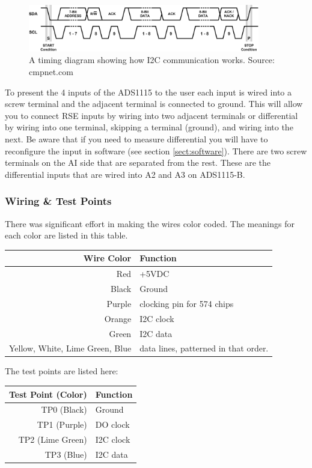 \documentclass{article}
\begin{document}
\begin{figure}
\centering
\includegraphics[width=0.9\textwidth]{i2cTiming.png}
\caption{A timing diagram showing how I2C communication works. Source: cmpnet.com}
\label{fig:i2cTiming}
\end{figure}

To present the 4 inputs of the ADS1115 to the user each input is wired into a screw terminal and the adjacent terminal is connected to ground. This will allow you to connect RSE inputs by wiring into two adjacent terminals or differential by wiring into one terminal, skipping a terminal (ground), and wiring into the next. Be aware that if you need to measure differential you will have to reconfigure the input in software (see section \ref{sect:software}). There are two screw terminals on the AI side that are separated from the rest. These are the differential inputs that are wired into A2 and A3 on ADS1115-B.


\subsubsection{Wiring \& Test Points}
There was significant effort in making the wires color coded. The meanings for each color are listed in this table.

\begin{table}[h]
\begin{tabular}{r|l}
Wire Color & Function \\ \hline
Red & +5VDC \\ \hline
Black & Ground \\ \hline
Purple & clocking pin for 574 chips \\ \hline
Orange & I2C clock \\ \hline
Green & I2C data \\ \hline
Yellow, White, Lime Green, Blue & data lines, patterned in that order. \\
\end{tabular}
\end{table}

The test points are listed here:

\begin{table}[h]
\begin{tabular}{r|l}
Test Point (Color) & Function \\ \hline
TP0 (Black) & Ground  \\ \hline
TP1 (Purple) & DO clock \\ \hline
TP2 (Lime Green) & I2C clock \\ \hline
TP3 (Blue) & I2C data \\ 
\end{tabular}
\end{table}
\end{document}
